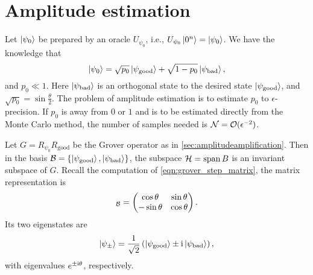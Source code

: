 \section{Amplitude estimation}\label{sec:amplitude_estimate}

Let \(\ket{\psi_0}\) be prepared by an oracle $U_{\psi_0}$, i.e., $U_{\psi_0}\ket{0^n}=\ket{\psi_0}$.
We have the knowledge that
\begin{equation}
\ket{\psi_0}=\sqrt{p_0} \ket{\psi_{\mathrm{good}}}+\sqrt{1-p_0} \ket{\psi_{\mathrm{bad}}},
\end{equation}
and $p_0\ll 1$. Here $\ket{\psi_{\mathrm{bad}}}$ is an orthogonal state to the desired state $\ket{\psi_{\mathrm{good}}}$, and
 $\sqrt{p_0}=\sin\frac{\theta}{2}$.
The problem of amplitude estimation is to estimate $p_0$ to $\epsilon$-precision.
If $p_0$ is away from $0$ or $1$ and is to be estimated directly from the Monte Carlo method, the number of samples needed is $\mathcal{N}=\mathcal{O}(\epsilon^{-2})$.


Let $G=R_{\psi_0}R_{\mathrm{good}}$ be the Grover operator as in \cref{sec:amplitudeamplification}.
Then in the basis $\mathcal{B}=\{\ket{\psi_{\mathrm{good}}},\ket{\psi_{\mathrm{bad}}}\}$, the subspace $\mathcal{H}=\operatorname{span}{B}$ is an invariant subspace of $G$.
Recall the computation of \cref{eqn:grover_step_matrix}, the matrix representation is
\begin{equation}
[G]_{\mc{B}}=\begin{pmatrix}
\cos \theta & \sin\theta \\
-\sin\theta & \cos\theta
\end{pmatrix}.
\end{equation}
Its two eigenstates are
\begin{equation}
\ket{\psi_\pm}=\frac{1}{\sqrt{2}} \left(\ket{\psi_{\mathrm{good}}}\pm\mathrm{i} \ket{\psi_{\mathrm{bad}}}\right),
\end{equation}
with eigenvalues $e^{\pm \mathrm{i} \theta}$, respectively.

